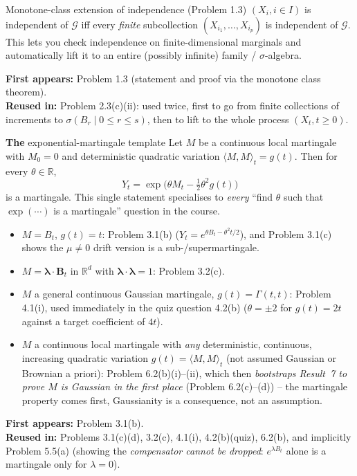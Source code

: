 \documentclass[11pt]{article}
\newcommand{\R}{\mathbb{R}}
\newcommand{\br}[1]{\langle #1\rangle}
\newcommand{\used}[2]{\begin{sourcebox}\textbf{First appears:} #1 \\ \textbf{Reused in:} #2\end{sourcebox}}
\begin{document}
\begin{result}{Monotone-class extension of independence (Problem 1.3)}
\label{res:6}
$(X_i,i\in I)$ is independent of $\mathcal G$ iff every \emph{finite} subcollection
$(X_{i_1},\dots,X_{i_p})$ is independent of $\mathcal G$. This lets you check
independence on finite-dimensional marginals and automatically lift it to an
entire (possibly infinite) family / $\sigma$-algebra.
\end{result}
\used{Problem 1.3 (statement and proof via the monotone class theorem).}{Problem
2.3(c)(ii): used twice, first to go from finite collections of increments to
$\sigma(B_r\mid 0\le r\le s)$, then to lift to the whole process $(X_t,t\ge0)$.}

\begin{result}{\textbf{The} exponential-martingale template}
\label{res:7}
Let $M$ be a continuous local martingale with $M_0=0$ and deterministic quadratic
variation $\br{M,M}_t=g(t)$. Then for every $\theta\in\R$,
\[
Y_t=\exp\!\Big(\theta M_t-\tfrac12\theta^2 g(t)\Big)
\]
is a martingale. This single statement specialises to \emph{every} ``find
$\theta$ such that $\exp(\cdots)$ is a martingale'' question in the course.
\end{result}
\begin{itemize}[leftmargin=*]
  \item $M=B_t$, $g(t)=t$: Problem 3.1(b) ($Y_t=e^{\theta B_t-\theta^2t/2}$), and
  Problem 3.1(c) shows the $\mu\ne0$ drift version is a sub-/supermartingale.
  \item $M=\boldsymbol\lambda\cdot\boldsymbol B_t$ in $\R^d$ with
  $\boldsymbol\lambda\cdot\boldsymbol\lambda=1$: Problem 3.2(c).
  \item $M$ a general continuous Gaussian martingale, $g(t)=\Gamma(t,t)$: Problem
  4.1(i), used immediately in the quiz question 4.2(b) ($\theta=\pm2$ for
  $g(t)=2t$ against a target coefficient of $4t$).
  \item $M$ a continuous local martingale with \emph{any} deterministic,
  continuous, increasing quadratic variation $g(t)=\br{M,M}_t$ (not assumed
  Gaussian or Brownian a priori): Problem 6.2(b)(i)--(ii), which then
  \emph{bootstraps Result~7 to prove $M$ is Gaussian in the first place}
  (Problem 6.2(c)--(d)) -- the martingale property comes first, Gaussianity is a
  consequence, not an assumption.
\end{itemize}
\used{Problem 3.1(b).}{Problems 3.1(c)(d), 3.2(c), 4.1(i), 4.2(b)(quiz), 6.2(b),
and implicitly Problem 5.5(a) (showing the \emph{compensator cannot be dropped}:
$e^{\lambda B_t}$ alone is a martingale only for $\lambda=0$).}
\end{document}
